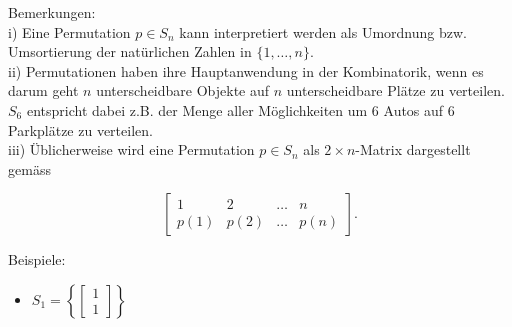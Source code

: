 \documentclass[10pt]{article}
\begin{document}
Bemerkungen:\\
i) Eine Permutation $p \in S_{n}$ kann interpretiert werden als Umordnung bzw. Umsortierung der natürlichen Zahlen in $\{1, \ldots, n\}$.\\
ii) Permutationen haben ihre Hauptanwendung in der Kombinatorik, wenn es darum geht $n$ unterscheidbare Objekte auf $n$ unterscheidbare Plätze zu verteilen. $S_{6}$ entspricht dabei z.B. der Menge aller Möglichkeiten um 6 Autos auf 6 Parkplätze zu verteilen.\\
iii) Üblicherweise wird eine Permutation $p \in S_{n}$ als $2 \times n$-Matrix dargestellt gemäss

\[
\left[\begin{array}{cccc}
1 & 2 & \ldots & n  \tag{6.101}\\
p(1) & p(2) & \ldots & p(n)
\end{array}\right] .
\]

Beispiele:

\begin{itemize}
  \item $S_{1}=\left\{\left[\begin{array}{l}1 \\ 1\end{array}\right]\right\}$
\end{itemize}
\end{document}
